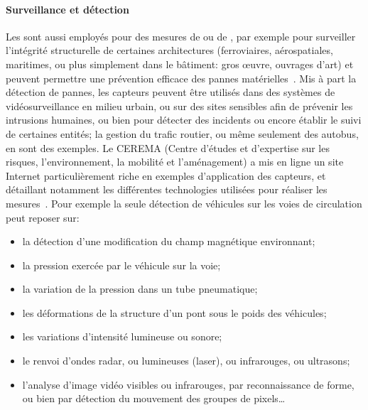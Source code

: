         \paragraph{Surveillance et détection}
Les \rcsfs sont aussi employés pour des mesures de  ou de \secu, par exemple pour surveiller l'intégrité structurelle de certaines architectures (ferroviaires, aérospatiales, maritimes, ou plus simplement dans le bâtiment: gros œuvre, ouvrages d'art) et peuvent permettre une prévention efficace des pannes matérielles~\cite{SCOA13}.
Mis à part la détection de pannes, les capteurs peuvent être utilisés dans des systèmes de vidéosurveillance en milieu urbain, ou sur des sites sensibles afin de prévenir les intrusions humaines, ou bien pour détecter des incidents ou encore établir le suivi de certaines entités; la gestion du trafic routier, ou même seulement des autobus, en sont des exemples.
Le CEREMA (Centre d'études et d'expertise sur les risques, l'environnement, la mobilité et l'aménagement) a mis en ligne un site Internet particulièrement riche en exemples d'application des capteurs, et détaillant notamment les différentes technologies utilisées pour réaliser les mesures~\cite{sti}.
Pour exemple la seule détection de véhicules sur les voies de circulation peut reposer sur:
\begin{itemize}
    \item la détection d'une modification du champ magnétique environnant;
    \item la pression exercée par le véhicule sur la voie;
    \item la variation de la pression dans un tube pneumatique;
    \item les déformations de la structure d'un pont sous le poids des véhicules;
    \item les variations d'intensité lumineuse ou sonore;
    \item le renvoi d'ondes radar, ou lumineuses (laser), ou infrarouges, ou ultrasons;
    \item l'analyse d'image vidéo visibles ou infrarouges, par reconnaissance de forme, ou bien par détection du mouvement des groupes de pixels…
\end{itemize}


